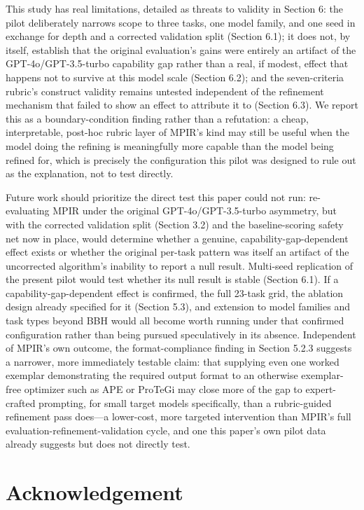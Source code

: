 \documentclass[a4paper,fleqn]{cas-sc}
\begin{document}
This study has real limitations, detailed as threats to validity in Section 6: the pilot deliberately narrows scope to three tasks, one model family, and one seed in exchange for depth and a corrected validation split (Section 6.1); it does not, by itself, establish that the original evaluation's gains were entirely an artifact of the GPT-4o/GPT-3.5-turbo capability gap rather than a real, if modest, effect that happens not to survive at this model scale (Section 6.2); and the seven-criteria rubric's construct validity remains untested independent of the refinement mechanism that failed to show an effect to attribute it to (Section 6.3). We report this as a boundary-condition finding rather than a refutation: a cheap, interpretable, post-hoc rubric layer of MPIR's kind may still be useful when the model doing the refining is meaningfully more capable than the model being refined for, which is precisely the configuration this pilot was designed to rule out as the explanation, not to test directly.

Future work should prioritize the direct test this paper could not run: re-evaluating MPIR under the original GPT-4o/GPT-3.5-turbo asymmetry, but with the corrected validation split (Section 3.2) and the baseline-scoring safety net now in place, would determine whether a genuine, capability-gap-dependent effect exists or whether the original per-task pattern was itself an artifact of the uncorrected algorithm's inability to report a null result. Multi-seed replication of the present pilot would test whether its null result is stable (Section 6.1). If a capability-gap-dependent effect is confirmed, the full 23-task grid, the ablation design already specified for it (Section 5.3), and extension to model families and task types beyond BBH would all become worth running under that confirmed configuration rather than being pursued speculatively in its absence. Independent of MPIR's own outcome, the format-compliance finding in Section 5.2.3 suggests a narrower, more immediately testable claim: that supplying even one worked exemplar demonstrating the required output format to an otherwise exemplar-free optimizer such as APE or ProTeGi may close more of the gap to expert-crafted prompting, for small target models specifically, than a rubric-guided refinement pass does---a lower-cost, more targeted intervention than MPIR's full evaluation-refinement-validation cycle, and one this paper's own pilot data already suggests but does not directly test.

\section{Acknowledgement}
\end{document}
